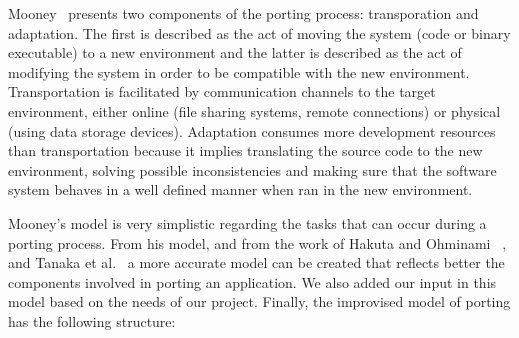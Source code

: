 Mooney~\cite{mooney1990strategies} presents two components of the porting process:
transporation and adaptation. The first is described as the act of moving the
system (code or binary executable) to a new environment and the latter is
described as the act of modifying the system in order to be compatible with the
new environment. Transportation is facilitated by communication channels to the
target environment, either online (file sharing systems, remote connections) or
physical (using data storage devices). Adaptation consumes more development
resources than transportation because it implies translating the source code to
the new environment, solving possible inconsistencies and making sure that the
software system behaves in a well defined manner when ran in the new
environment.

Mooney's model is very simplistic regarding the tasks that can occur during
a porting process. From his model, and from the work of Hakuta and Ohminami~
\cite{hakuta}, and Tanaka et al.~\cite{tanaka} a more accurate model can be created that
reflects better the components involved in porting an application. We also added
our input in this model based on the needs of our project. Finally, the improvised model of porting has the following structure:
